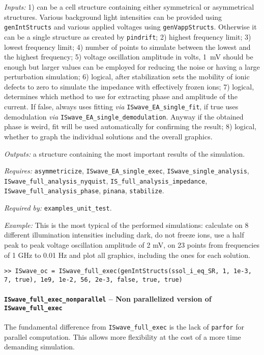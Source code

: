 	\textit{Inputs:} 1) can be a cell structure containing either symmetrical or asymmetrical structures. Various background
	light intensities can be provided using \texttt{gen\-Int\-Structs} and various applied voltages using \texttt{gen\-Vapp\-Structs}.
	Otherwise it can be a single structure as created by \texttt{pindrift};
	2) highest frequency limit;
	3) lowest frequency limit;
	4) number of points to simulate between the lowest and
	the highest frequency;
	5) voltage oscillation amplitude in volts, \SI{1}{\mV} should be enough but larger values can be employed for reducing the noise or having a large perturbation simulation;
	6) logical, after stabilization sets the mobility of
	ionic defects to zero to simulate the impedance with effectively frozen ions;
	7) logical, determines which method to use for extracting phase and amplitude of the current.
	If false, always uses fitting \textsl{via} \texttt{ISwave\_EA\_single\_fit}, if true uses demodulation \textsl{via} \texttt{ISwave\_EA\_single\_demodulation}. Anyway if the obtained phase is weird, fit will be used
	automatically for confirming the result;
	8) logical, whether to graph the individual solutions and
	the overall graphics.

	\textit{Outputs:} a structure containing the most important results of the simulation.

	\textit{Requires:} \texttt{asymmetricize}, \texttt{ISwave\_EA\_single\_exec},
	\texttt{ISwave\_single\_analysis}, \texttt{ISwave\_full\_analysis\_nyquist},
	\texttt{IS\_full\_analysis\_impedance}, \texttt{ISwave\_full\_analysis\_phase}, \texttt{pinana},
	\texttt{stabilize}.

	\textit{Required by:} \texttt{examples\_unit\_test}.

	\textit{Example:} This is the most typical of the performed simulations: calculate on 8 different illumination intensities including dark, do not freeze ions, use a half peak to peak
	voltage oscillation amplitude of 2 mV, on 23 points from frequencies of 1 GHz to
	0.01 Hz and plot all graphics, including the ones for each solution.
	\begin{lstlisting}[style=Matlab-editor]
>> ISwave_oc = ISwave_full_exec(genIntStructs(ssol_i_eq_SR, 1, 1e-3, 7, true), 1e9, 1e-2, 56, 2e-3, false, true, true)
\end{lstlisting}

	\paragraph{\texttt{ISwave\_full\_exec\_nonparallel} -- Non parallelized version of \texttt{ISwave\_full\_exec}}
	The fundamental difference from \texttt{ISwave\_full\_exec} is the lack of \texttt{parfor}
	for parallel computation. This allows more flexibility at the cost of a
	more time demanding simulation.

